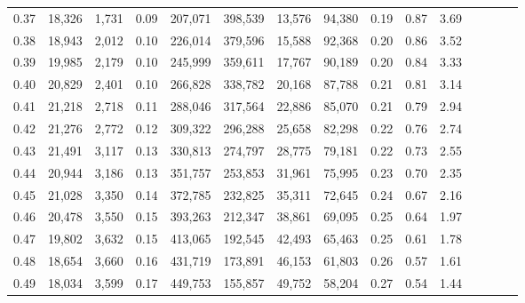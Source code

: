 \begin{tabular}{rrrcrrrrrrrrrrr}
0.37 &  18,326 &  1,731 &                                       0.09 &  207,071 &  398,539 &   13,576 &   94,380 &  0.19 &  0.87 &                         3.69 \\
0.38 &  18,943 &  2,012 &                                       0.10 &  226,014 &  379,596 &   15,588 &   92,368 &  0.20 &  0.86 &                         3.52 \\
0.39 &  19,985 &  2,179 &                                       0.10 &  245,999 &  359,611 &   17,767 &   90,189 &  0.20 &  0.84 &                         3.33 \\
0.40 &  20,829 &  2,401 &                                       0.10 &  266,828 &  338,782 &   20,168 &   87,788 &  0.21 &  0.81 &                         3.14 \\
0.41 &  21,218 &  2,718 &                                       0.11 &  288,046 &  317,564 &   22,886 &   85,070 &  0.21 &  0.79 &                         2.94 \\
0.42 &  21,276 &  2,772 &                                       0.12 &  309,322 &  296,288 &   25,658 &   82,298 &  0.22 &  0.76 &                         2.74 \\
0.43 &  21,491 &  3,117 &                                       0.13 &  330,813 &  274,797 &   28,775 &   79,181 &  0.22 &  0.73 &                         2.55 \\
0.44 &  20,944 &  3,186 &                                       0.13 &  351,757 &  253,853 &   31,961 &   75,995 &  0.23 &  0.70 &                         2.35 \\
0.45 &  21,028 &  3,350 &                                       0.14 &  372,785 &  232,825 &   35,311 &   72,645 &  0.24 &  0.67 &                         2.16 \\
0.46 &  20,478 &  3,550 &                                       0.15 &  393,263 &  212,347 &   38,861 &   69,095 &  0.25 &  0.64 &                         1.97 \\
0.47 &  19,802 &  3,632 &                                       0.15 &  413,065 &  192,545 &   42,493 &   65,463 &  0.25 &  0.61 &                         1.78 \\
0.48 &  18,654 &  3,660 &                                       0.16 &  431,719 &  173,891 &   46,153 &   61,803 &  0.26 &  0.57 &                         1.61 \\
0.49 &  18,034 &  3,599 &                                       0.17 &  449,753 &  155,857 &   49,752 &   58,204 &  0.27 &  0.54 &                         1.44 \\

\end{tabular}
